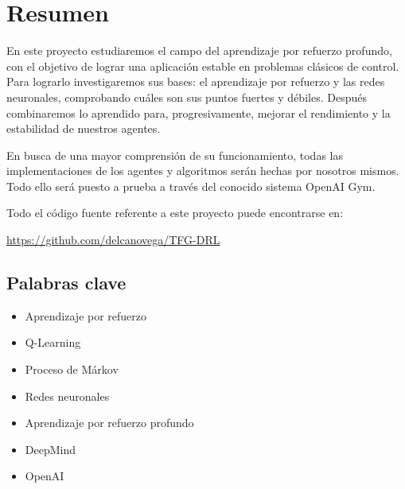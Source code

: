\chapter*{Resumen}

En este proyecto estudiaremos el campo del aprendizaje por refuerzo profundo, con el objetivo de lograr una aplicación estable en problemas clásicos de control. Para lograrlo investigaremos sus bases: el aprendizaje por refuerzo y las redes neuronales, comprobando cuáles son sus puntos fuertes y débiles. Después combinaremos lo aprendido para, progresivamente, mejorar el rendimiento y la estabilidad de nuestros agentes.

En busca de una mayor comprensión de su funcionamiento, todas las implementaciones de los agentes y algoritmos serán hechas por nosotros mismos. Todo ello será puesto a prueba a través del conocido sistema OpenAI Gym.

Todo el código fuente referente a este proyecto puede encontrarse en:

\url{https://github.com/delcanovega/TFG-DRL}

\section*{Palabras clave}
   
\begin{itemize}
    \item Aprendizaje por refuerzo
    \item Q-Learning
    \item Proceso de Márkov
    \item Redes neuronales
    \item Aprendizaje por refuerzo profundo
    \item DeepMind 
    \item OpenAI
\end{itemize}